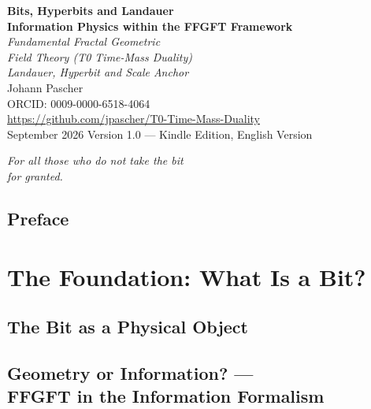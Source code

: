 \documentclass[11pt,twoside,openright]{book}
\theoremstyle{plain}
\theoremstyle{definition}
\begin{document}
\begin{titlepage}
\centering\vspace*{1.5cm}
{\Huge\bfseries\color{blue!70!black}
  Bits, Hyperbits and Landauer}\\[0.6cm]
{\Large\bfseries\color{blue!40!black}
  Information Physics within the FFGFT Framework}\\[1cm]
{\LARGE\itshape Fundamental Fractal Geometric\\[0.2cm]
  Field Theory (T0 Time-Mass Duality)}\\[0.5cm]
{\large\itshape Landauer, Hyperbit and Scale Anchor}\\[2cm]
{\large Johann Pascher}\\[0.3cm]
{\normalsize ORCID: 0009-0000-6518-4064}\\[0.3cm]
{\normalsize\url{https://github.com/jpascher/T0-Time-Mass-Duality}}\\[1.5cm]
{\normalsize September 2026}
\vfill{\small Version 1.0 --- Kindle Edition, English Version}
\end{titlepage}

\thispagestyle{empty}
\vspace*{0.3\textheight}
\begin{center}
\itshape\large
For all those who do not take the bit\\
for granted.
\end{center}
\vfill

\tableofcontents

\chapter*{Preface}


\mainmatter

\part{The Foundation: What Is a Bit?}

\chapter{The Bit as a Physical Object}


\chapter[Geometry or Information?]{Geometry or Information? ---\\
FFGFT in the Information Formalism}

\end{document}
